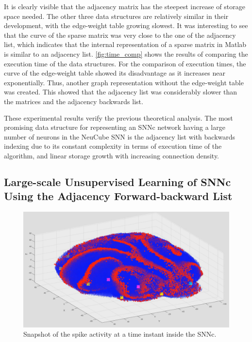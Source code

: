 It is clearly visible that the adjacency matrix has the steepest increase of storage space needed. The other three data structures are relatively similar in their development, with the edge-weight table growing slowest. It was interesting to see that the curve of the sparse matrix was very close to the one of the adjacency list, which indicates that the internal representation of a sparse matrix in Matlab is similar to an adjacency list. \figurename \ref{fig:time_comp} shows the results of comparing the execution time of the data structures. For the comparison of execution times, the curve of the edge-weight table showed its disadvantage as it increases near exponentially. Thus, another graph representation without the edge-weight table was created. This showed that the adjacency list was considerably slower than the matrices and the adjacency backwards list.

These experimental results verify the previous theoretical analysis. The most promising data structure for representing an SNNc network having a large number of neurons in the NeuCube SNN is the adjacency list with backwards indexing due to its constant complexity in terms of execution time of the algorithm, and linear storage growth with increasing connection density.


\subsection{Large-scale Unsupervised Learning of SNNc Using the Adjacency Forward-backward List}

\begin{figure}
	\centering
	\includegraphics[width=0.8\linewidth]{fig/largesnn/spike_simulation.png}
	\caption{Snapshot of the spike activity at a time instant inside the SNNc.}
	\label{fig:spike_simulation}
\end{figure}

